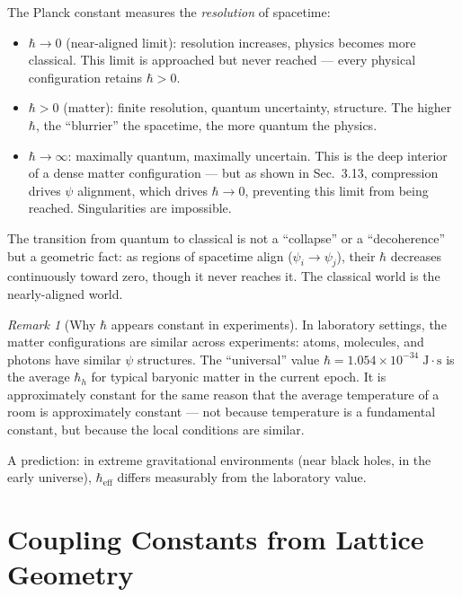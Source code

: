 \documentclass[12pt]{article}
\theoremstyle{remark}
\newtheorem{remark}[theorem]{Remark}
\theoremstyle{definition}
\begin{document}
The Planck constant measures the \emph{resolution} of spacetime:
\begin{itemize}
\item $\hbar \to 0$ (near-aligned limit): resolution increases, physics becomes more classical. This limit is approached but never reached --- every physical configuration retains $\hbar > 0$.
\item $\hbar > 0$ (matter): finite resolution, quantum uncertainty, structure. The higher $\hbar$, the ``blurrier'' the spacetime, the more quantum the physics.
\item $\hbar \to \infty$: maximally quantum, maximally uncertain. This is the deep interior of a dense matter configuration --- but as shown in Sec.~3.13, compression drives $\psi$ alignment, which drives $\hbar \to 0$, preventing this limit from being reached. Singularities are impossible.
\end{itemize}

The transition from quantum to classical is not a ``collapse'' or a ``decoherence'' but a geometric fact: as regions of spacetime align ($\psi_i \to \psi_j$), their $\hbar$ decreases continuously toward zero, though it never reaches it. The classical world is the nearly-aligned world.

\begin{remark}[Why $\hbar$ appears constant in experiments]
In laboratory settings, the matter configurations are similar across experiments: atoms, molecules, and photons have similar $\psi$ structures. The ``universal'' value $\hbar = 1.054 \times 10^{-34}\;\text{J}\cdot\text{s}$ is the average $\hbar_h$ for typical baryonic matter in the current epoch. It is approximately constant for the same reason that the average temperature of a room is approximately constant --- not because temperature is a fundamental constant, but because the local conditions are similar.

A prediction: in extreme gravitational environments (near black holes, in the early universe), $\hbar_\text{eff}$ differs measurably from the laboratory value.
\end{remark}

\section{Coupling Constants from Lattice Geometry}
\label{ch:couplings}
\end{document}
